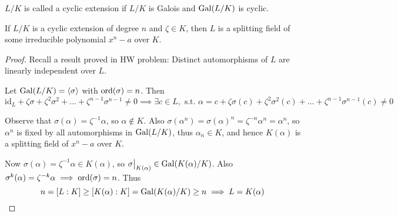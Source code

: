 \begin{definition}
  $L/K$ is called a cyclic extension if $L/K$ is Galois and $\operatorname{Gal}(L/K)$ is cyclic.
\end{definition}

\begin{theorem} \label{thm:kummer-base-theorem}
  If $L/K$ is a cyclic extension of degree $n$ and $\zeta \in K$, then $L$ is a splitting field of
  some irreducible polynomial $x^n - a$ over $K$.

  \begin{proof}
    Recall a result proved in HW problem: Distinct automorphisms of $L$ are linearly independent over $L$.
    
    Let $\operatorname{Gal}(L/K) = \langle\sigma\rangle$ with $\operatorname{ord}(\sigma) = n$. Then
    \[ \text{id}_L + \zeta \sigma + \zeta^2 \sigma^2 + \dots + \zeta^{n-1} \sigma^{n-1} \neq 0
      \implies \exists c \in L, \text{ s.t. } \alpha = c + \zeta \sigma(c) + \zeta^2 \sigma^2(c)
      + \dots + \zeta^{n-1} \sigma^{n-1}(c) \neq 0 \]

    Observe that $\sigma(\alpha) = \zeta^{-1} \alpha$, so $\alpha \not\in K$. Also $\sigma(\alpha^n)
    = \sigma(\alpha)^n = \zeta^{-n}\alpha^n = \alpha^n$, so $\alpha^n$ is fixed by all automorphisms
    in $\operatorname{Gal}(L/K)$, thus $\alpha_n \in K$, and hence $K(\alpha)$ is a splitting field of $x^n - a$ over $K$.

    Now $\sigma(\alpha) = \zeta^{-1}\alpha \in K(\alpha)$, so $\sigma\big|_{K(\alpha)} \in \operatorname{Gal}(K(\alpha) / K)$.
    Also $\sigma^k(\alpha) = \zeta^{-k} \alpha \implies \operatorname{ord}(\sigma) = n$.
    Thus
    \[
      n = [L: K] \geq [K(\alpha): K] = \operatorname{Gal}(K(\alpha) / K) \geq n \implies L = K(\alpha)
      \qedhere
    \]
  \end{proof}
\end{theorem}

